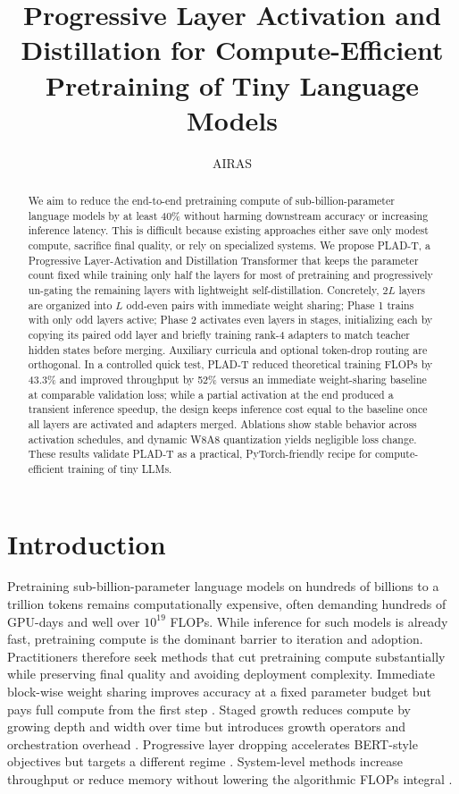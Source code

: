 \documentclass{article}
\title{Progressive Layer Activation and Distillation for Compute-Efficient Pretraining of Tiny Language Models}
\author{AIRAS}
\begin{document}
\maketitle

\begin{abstract}
We aim to reduce the end-to-end pretraining compute of sub-billion-parameter language models by at least 40\% without harming downstream accuracy or increasing inference latency. This is difficult because existing approaches either save only modest compute, sacrifice final quality, or rely on specialized systems. We propose PLAD-T, a Progressive Layer-Activation and Distillation Transformer that keeps the parameter count fixed while training only half the layers for most of pretraining and progressively un-gating the remaining layers with lightweight self-distillation. Concretely, \(2L\) layers are organized into \(L\) odd-even pairs with immediate weight sharing; Phase 1 trains with only odd layers active; Phase 2 activates even layers in stages, initializing each by copying its paired odd layer and briefly training rank-4 adapters to match teacher hidden states before merging. Auxiliary curricula and optional token-drop routing are orthogonal. In a controlled quick test, PLAD-T reduced theoretical training FLOPs by 43.3\% and improved throughput by 52\% versus an immediate weight-sharing baseline at comparable validation loss; while a partial activation at the end produced a transient inference speedup, the design keeps inference cost equal to the baseline once all layers are activated and adapters merged. Ablations show stable behavior across activation schedules, and dynamic W8A8 quantization yields negligible loss change. These results validate PLAD-T as a practical, PyTorch-friendly recipe for compute-efficient training of tiny LLMs.
\end{abstract}

\section{Introduction}
Pretraining sub-billion-parameter language models on hundreds of billions to a trillion tokens remains computationally expensive, often demanding hundreds of GPU-days and well over \(10^{19}\) FLOPs. While inference for such models is already fast, pretraining compute is the dominant barrier to iteration and adoption. Practitioners therefore seek methods that cut pretraining compute substantially while preserving final quality and avoiding deployment complexity. Immediate block-wise weight sharing improves accuracy at a fixed parameter budget but pays full compute from the first step \cite{liu-2024-mobilellm}. Staged growth reduces compute by growing depth and width over time but introduces growth operators and orchestration overhead \cite{shen-2022-staged}. Progressive layer dropping accelerates BERT-style objectives but targets a different regime \cite{zhang-2020-accelerating}. System-level methods increase throughput or reduce memory without lowering the algorithmic FLOPs integral \cite{andoorveedu-2022-tempo,narayanan-2020-memory,jia-2024-toward}.
\end{document}
